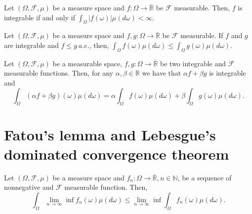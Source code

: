 \begin{proposition}
    \label{prop:8.6}
    Let $(\Omega, \mathcal{F}, \mu)$ be a measure space  and $f: \Omega\to \overline{\mathbb{R}}$ be 
    $\mathcal{F}$ measurable. Then, $f$ is integrable if and only if
    $\int_{\Omega} \lvert f(\omega) \rvert \mu(d\omega) < \infty$.
\end{proposition}

\begin{proposition}
    \label{prop:8.7}
    Let $(\Omega, \mathcal{F}, \mu)$ be a measure space and $f, g: \Omega \to \overline{\mathbb{R}}$ 
    be $\mathcal{F}$ measurable. If $f$ and $g$ are integrable and $f\le g \ a.e.$, then,
    $\int_{\Omega} f(\omega)\mu(d\omega) \le \int_{\Omega}g(\omega)\mu(d\omega)$.
\end{proposition}

\begin{proposition}
    \label{prop:8.8}
    Let $(\Omega, \mathcal{F}, \mu)$ be a measurable space, $f, g: \Omega \to \overline{\mathbb{R}}$
    be two integrable and $\mathcal{F}$ measurable functions. Then, for any $\alpha, \beta \in \mathbb{R}$ 
    we have that $\alpha f + \beta g$ is integrable and
    \[
    \int_{\Omega} (\alpha f + \beta g)(\omega)\mu(d\omega) =
    \alpha \int_{\Omega} f(\omega)\mu(d\omega) + \beta \int_{\Omega} g(\omega)\mu(d\omega)
    .\] 
\end{proposition}

\section{Fatou's lemma and Lebesgue's dominated convergence theorem}%
\label{sec:Fatou's lemma and Lebesgue's dominated convergence theorem}

\begin{proposition}
    \label{prop:8.9}
    Let $(\Omega, \mathcal{F}, \mu)$ be a measure space and $f_n: \Omega \to \overline{\mathbb{R}},
    n \in \mathbb{N}$, be a sequence of nonnegative and $\mathcal{F}$ measurable function. Then,
    \[
    \int_{\Omega} \lim_{n \to \infty} \inf f_n(\omega)\mu(d\omega) \le 
    \lim_{n \to \infty} \inf \int_{\Omega} f_n(\omega)\mu(d\omega)
    .\] 
\end{proposition}




